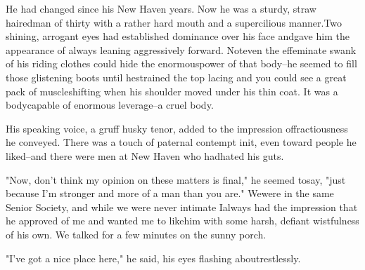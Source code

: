\documentclass[12pt,a4paper]{report}
\begin{document}
He had changed since his New Haven years. Now he was a sturdy, straw hairedman of thirty with a rather hard mouth and a supercilious manner.Two shining, arrogant eyes had established dominance over his face andgave him the appearance of always leaning aggressively forward. Noteven the effeminate swank of his riding clothes could hide the enormouspower of that body--he seemed to fill those glistening boots until hestrained the top lacing and you could see a great pack of muscleshifting when his shoulder moved under his thin coat. It was a bodycapable of enormous leverage--a cruel body.

His speaking voice, a gruff husky tenor, added to the impression offractiousness he conveyed. There was a touch of paternal contempt init, even toward people he liked--and there were men at New Haven who hadhated his guts.

"Now, don't think my opinion on these matters is final," he seemed tosay, "just because I'm stronger and more of a man than you are." Wewere in the same Senior Society, and while we were never intimate Ialways had the impression that he approved of me and wanted me to likehim with some harsh, defiant wistfulness of his own.
We talked for a few minutes on the sunny porch.

"I've got a nice place here," he said, his eyes flashing aboutrestlessly.




\end{document}
